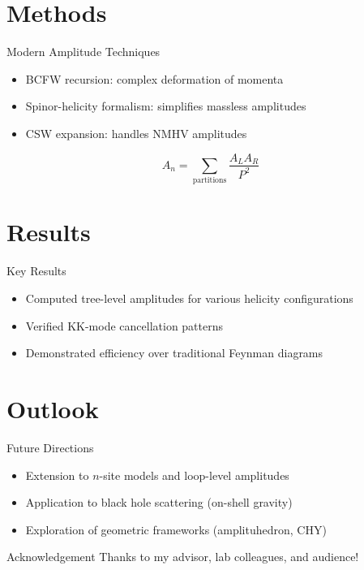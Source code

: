 \documentclass{beamer}
\begin{document}
\section{Methods} 
\begin{frame}{Modern Amplitude Techniques}
  \begin{itemize}
    \item BCFW recursion: complex deformation of momenta
    \item Spinor-helicity formalism: simplifies massless amplitudes
    \item CSW expansion: handles NMHV amplitudes
  \end{itemize}
  \pause
  \[
  A_n = \sum_{\text{partitions}} \frac{A_L A_R}{P^2}
  \]
\end{frame}

\section{Results}
\begin{frame}{Key Results}
  \begin{itemize}
    \item Computed tree-level amplitudes for various helicity configurations
    \item Verified KK-mode cancellation patterns
    \item Demonstrated efficiency over traditional Feynman diagrams
  \end{itemize}
\end{frame}

\section{Outlook}
\begin{frame}{Future Directions}
  \begin{itemize}
    \item Extension to $n$-site models and loop-level amplitudes
    \item Application to black hole scattering (on-shell gravity)
    \item Exploration of geometric frameworks (amplituhedron, CHY)
  \end{itemize}
\end{frame}

\begin{frame}{Acknowledgement}
  \centering
  Thanks to my advisor, lab colleagues, and audience!
\end{frame}
\end{document}
